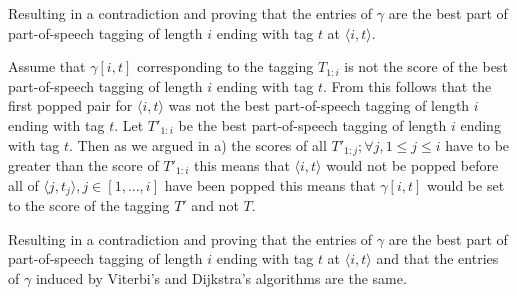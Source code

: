 \documentclass[a4paper,12pt]{ETHexercise}
\begin{document}
Resulting in a contradiction and proving that the entries of $\gamma$ are the best part of part-of-speech tagging of length $i$ ending with tag $t$ at $\langle i, t\rangle$.

Assume that $\gamma[i,t]$ corresponding to the tagging $T_{1:i}$ is not the score of the best part-of-speech tagging of length $i$ ending with tag $t$. From this follows that the first popped pair for $\langle i, t\rangle$ was not the best part-of-speech tagging of length $i$ ending with tag $t$. Let $T'_{1:i}$ be the best part-of-speech tagging of length $i$ ending with tag $t$.
Then as we argued in a) the scores of all $T'_{1:j}; \forall j , 1 \leq j \leq i$ have to be greater than the score of $T'_{1:i}$ this means that $\langle i, t\rangle$ would not be popped before all of $\langle j, t_j\rangle, j \in [1,...,i]$ have been popped this means that $\gamma[i,t]$ would be set to the score of the tagging $T'$ and not $T$.

Resulting in a contradiction and proving that the entries of $\gamma$ are the best part of part-of-speech tagging of length $i$ ending with tag $t$ at $\langle i, t\rangle$ and that the entries of $\gamma$ induced by Viterbi's and Dijkstra's algorithms are the same.
\end{document}
